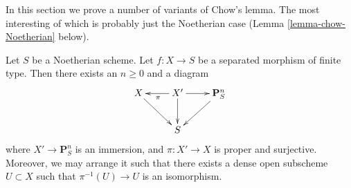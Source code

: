 \noindent
In this section we prove a number of variants of Chow's lemma.
The most interesting of which is probably just the Noetherian
case (Lemma \ref{lemma-chow-Noetherian} below).

\begin{lemma}
\label{lemma-chow-Noetherian}
Let $S$ be a Noetherian scheme.
Let $f : X \to S$ be a separated morphism of finite type.
Then there exists an $n \geq 0$ and a diagram
$$
\xymatrix{
X \ar[rd] & X' \ar[d] \ar[l]^\pi \ar[r] & \mathbf{P}^n_S \ar[dl] \\
& S &
}
$$
where $X' \to \mathbf{P}^n_S$ is an immersion, and
$\pi : X' \to X$ is proper and surjective. Moreover, we may
arrange it such that there exists a dense open subscheme
$U \subset X$ such that $\pi^{-1}(U) \to U$ is an isomorphism.
\end{lemma}

